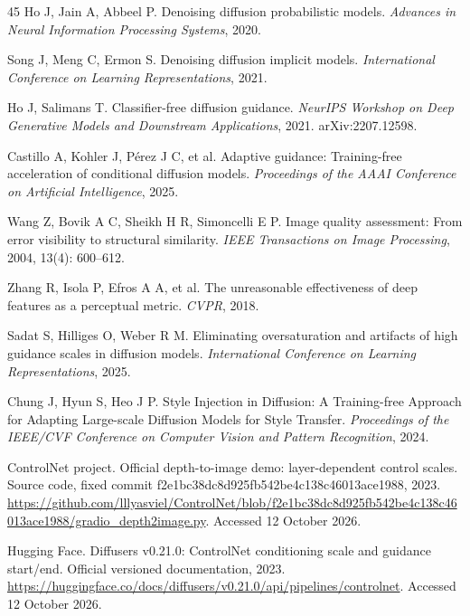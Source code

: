 \documentclass[times,twocolumn,final]{elsarticle}
\begin{document}
\begin{thebibliography}{45}
Ho J, Jain A, Abbeel P. Denoising diffusion probabilistic models. \textit{Advances in Neural Information Processing Systems}, 2020.

Song J, Meng C, Ermon S. Denoising diffusion implicit models. \textit{International Conference on Learning Representations}, 2021.

Ho J, Salimans T. Classifier-free diffusion guidance. \textit{NeurIPS Workshop on Deep Generative Models and Downstream Applications}, 2021. arXiv:2207.12598.

Castillo A, Kohler J, P\'erez J C, et al. Adaptive guidance: Training-free acceleration of conditional diffusion models. \textit{Proceedings of the AAAI Conference on Artificial Intelligence}, 2025.

Wang Z, Bovik A C, Sheikh H R, Simoncelli E P. Image quality assessment: From error visibility to structural similarity. \textit{IEEE Transactions on Image Processing}, 2004, 13(4): 600--612.

Zhang R, Isola P, Efros A A, et al. The unreasonable effectiveness of deep features as a perceptual metric. \textit{CVPR}, 2018.

Sadat S, Hilliges O, Weber R M. Eliminating oversaturation and artifacts of high guidance scales in diffusion models. \textit{International Conference on Learning Representations}, 2025.

Chung J, Hyun S, Heo J P. Style Injection in Diffusion: A Training-free Approach for Adapting Large-scale Diffusion Models for Style Transfer. \textit{Proceedings of the IEEE/CVF Conference on Computer Vision and Pattern Recognition}, 2024.

ControlNet project. Official depth-to-image demo: layer-dependent control scales. Source code, fixed commit f2e1bc38dc8d925fb542be4c138c46013ace1988, 2023. \url{https://github.com/lllyasviel/ControlNet/blob/f2e1bc38dc8d925fb542be4c138c46013ace1988/gradio_depth2image.py}. Accessed 12 October 2026.

Hugging Face. Diffusers v0.21.0: ControlNet conditioning scale and guidance start/end. Official versioned documentation, 2023. \url{https://huggingface.co/docs/diffusers/v0.21.0/api/pipelines/controlnet}. Accessed 12 October 2026.

\end{thebibliography}
\endgroup
\end{document}
